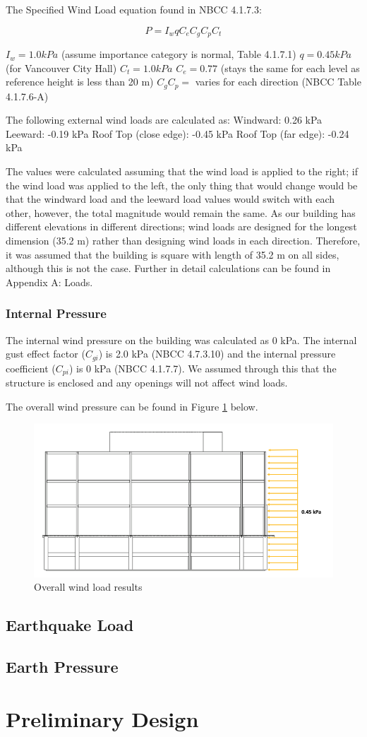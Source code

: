 \documentclass[12pt]{article}
\begin{document}
The Specified Wind Load equation found in NBCC 4.1.7.3:

\begin{equation*}
    P=I_{w}qC_{e}C_{g}C_{p}C_{t}
\end{equation*}

$I_{w}= 1.0 kPa$ (assume importance category is normal, Table 4.1.7.1)
$q= 0.45 kPa$ (for Vancouver City Hall)
$C_{t}= 1.0 kPa$
$C_{e}= 0.77$ (stays the same for each level as reference height is less than 20 m)
$C_{g}C_{p}=$ varies for each direction (NBCC Table 4.1.7.6-A)

The following external wind loads are calculated as:
Windward: 0.26 kPa
Leeward: -0.19 kPa
Roof Top (close edge): -0.45 kPa
Roof Top (far edge): -0.24 kPa

The values were calculated assuming that the wind load is applied to the right; if the wind load was applied to the left, the only thing that would change would be that the windward load and the leeward load values would switch with each other, however, the total magnitude would remain the same. As our building has different elevations in different directions; wind loads are designed for the longest dimension (35.2 m) rather than designing wind loads in each direction. Therefore, it was assumed that the building is square with length of 35.2 m on all sides, although this is not the case. Further in detail calculations can be found in Appendix A: Loads.
\subsubsection{Internal Pressure}
The internal wind pressure on the building was calculated as 0 kPa. The internal gust effect factor ($C_{gi}$) is 2.0 kPa (NBCC 4.7.3.10) and the internal pressure coefficient ($C_{pi}$) is 0 kPa (NBCC 4.1.7.7). We assumed through this that the structure is enclosed and any openings will not affect wind loads.

The overall wind pressure can be found in Figure \ref{fig:windload} below.

\begin{figure}[h!]
    \includegraphics[width=\linewidth]{Assets/windload.png}
    \caption{Overall wind load results}
    \label{fig:windload}
\end{figure}

\subsection{Earthquake Load}
\subsection{Earth Pressure}
\section{Preliminary Design}
\end{document}
